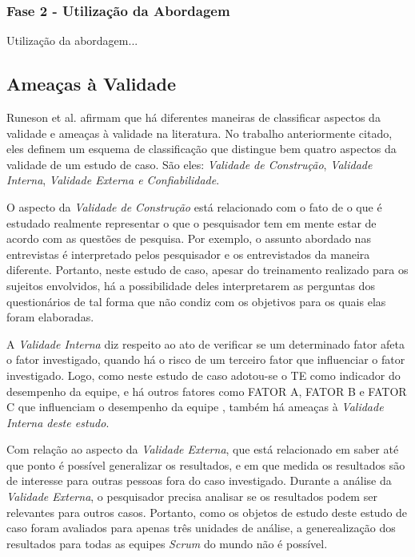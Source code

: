 \subsubsection{Fase 2 - Utilização da Abordagem}
\label{estudodecaso:design:procedimento:abordagem}

{\color{red} Utilização da abordagem...}

\subsection{Ameaças à Validade}
\label{estudodecaso:design:ameacas}

Runeson et al. \cite{runeson} afirmam que há diferentes maneiras de classificar aspectos da validade e ameaças à validade na literatura. No trabalho anteriormente citado, eles definem um esquema de classificação que distingue bem quatro aspectos da validade de um estudo de caso. São eles: \textit{Validade de Construção}, \textit{Validade Interna}, \textit{Validade Externa e Confiabilidade}.

O aspecto da \textit{Validade de Construção} está relacionado com o fato de o que é estudado realmente representar o que o pesquisador tem em mente estar de acordo com as questões de pesquisa. Por exemplo, o assunto abordado nas entrevistas é interpretado pelos pesquisador e os entrevistados da maneira diferente. Portanto, neste estudo de caso, apesar do treinamento realizado para os sujeitos envolvidos, há a possibilidade deles interpretarem as perguntas dos questionários de tal forma que não condiz com os objetivos para os quais elas foram elaboradas.

A \textit{Validade Interna} diz respeito ao ato de verificar se um determinado fator afeta o fator investigado, quando há o risco de um terceiro fator que influenciar o fator investigado. Logo, como neste estudo de caso adotou-se o TE como indicador do desempenho da equipe, e há outros fatores como FATOR A, FATOR B e FATOR C que influenciam o desempenho da equipe \cite{}, também há ameaças à \textit{Validade Interna deste estudo}.

Com relação ao aspecto da \textit{Validade Externa}, que está relacionado em saber até que ponto é possível generalizar os resultados, e em que medida os resultados são de interesse para outras pessoas fora do caso investigado. Durante a análise da \textit{Validade Externa}, o pesquisador precisa analisar se os resultados podem ser relevantes para outros casos. Portanto, como os objetos de estudo deste estudo de caso foram avaliados para apenas três unidades de análise, a generealização dos resultados para todas as equipes \textit{Scrum} do mundo não é possível.

